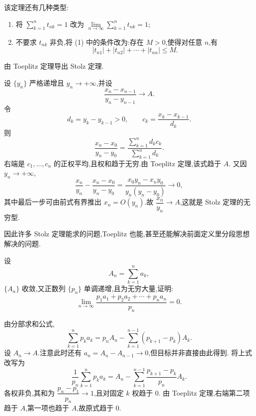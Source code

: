 \begin{remark}
  该定理还有几种类型:
  \begin{enumerate}
    \item 将 $\displaystyle \sum\limits_{k=1}^n t_{nk}=1$ 改为
          $\displaystyle \lim\limits_{n\to\infty}\sum\limits_{k=1}^n t_{nk}=1$;
    \item 不要求 $t_{nk}$ 非负,将 (1) 中的条件改为:存在 $M>0$,使得对任意 $n$,有
          \[
            |t_{n1}|+|t_{n2}|+\cdots+|t_{nn}|\leq M.
          \]
  \end{enumerate}
\end{remark}

\begin{example}
  由 Toeplitz 定理导出 Stolz 定理.
\end{example}
\exampleblank

\begin{solution}
  设 $\{y_n\}$ 严格递增且 $y_n\to+\infty$,并设
  \[
    \dfrac{x_n-x_{n-1}}{y_n-y_{n-1}}\longrightarrow A.
  \]
  令
  \[
    d_k=y_k-y_{k-1}>0,
    \qquad
    c_k=\dfrac{x_k-x_{k-1}}{d_k}.
  \]
  则
  \[
    \dfrac{x_n-x_0}{y_n-y_0}
    =\dfrac{\sum\limits_{k=1}^n d_kc_k}{\sum\limits_{k=1}^n d_k}.
  \]
  右端是 $c_1,\ldots,c_n$ 的正权平均,且权和趋于无穷.由 Toeplitz 定理,该式趋于 $A$.
  又因 $y_n\to+\infty$,
  \[
    \dfrac{x_n}{y_n}-\dfrac{x_n-x_0}{y_n-y_0}
    =\dfrac{x_0y_n-x_ny_0}{y_n(y_n-y_0)}\longrightarrow0,
  \]
  其中最后一步可由前式有界推出 $x_n=O(y_n)$.故
  $\dfrac{x_n}{y_n}\to A$,这就是 Stolz 定理的无穷型.
\end{solution}

\begin{remark}
  因此许多 Stolz 定理能求的问题,Toeplitz 也能,甚至还能解决前面定义里分段思想解决的问题.
\end{remark}

\begin{example}
  设
  \[
    A_n=\sum\limits_{k=1}^n a_k,
  \]
  $\{A_n\}$ 收敛,又正数列 $\{p_n\}$ 单调递增,且为无穷大量,证明:
  \[
    \lim\limits_{n\to\infty}
    \dfrac{p_1a_1+p_2a_2+\cdots+p_na_n}{p_n}=0.
  \]
\end{example}
\exampleblank

\begin{solution}
  由分部求和公式,
  \[
    \sum\limits_{k=1}^n p_ka_k
    =p_nA_n-\sum\limits_{k=1}^{n-1}(p_{k+1}-p_k)A_k.
  \]
  设 $A_n\to A$.注意此时还有 $a_n=A_n-A_{n-1}\to0$,但目标并非直接由此得到.
  将上式改写为
  \[
    \dfrac{1}{p_n}\sum\limits_{k=1}^n p_ka_k
    =A_n-\sum\limits_{k=1}^{n-1}
    \dfrac{p_{k+1}-p_k}{p_n}A_k.
  \]
  各权非负,其和为 $\dfrac{p_n-p_1}{p_n}\to1$,且对固定 $k$ 权趋于 $0$.
  由 Toeplitz 定理,右端第二项趋于 $A$,第一项也趋于 $A$,故原式趋于 $0$.
\end{solution}

